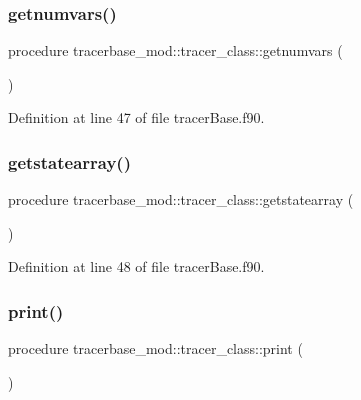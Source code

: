 \subsubsection{\texorpdfstring{getnumvars()}{getnumvars()}}
{\footnotesize\ttfamily procedure tracerbase\+\_\+mod\+::tracer\+\_\+class\+::getnumvars (\begin{DoxyParamCaption}{ }\end{DoxyParamCaption})\hspace{0.3cm}{\ttfamily [private]}}



Definition at line 47 of file tracer\+Base.\+f90.

\mbox{\label{structtracerbase__mod_1_1tracer__class_ada976e2f5180866e2d5999c087b38fdc}} 
\subsubsection{\texorpdfstring{getstatearray()}{getstatearray()}}
{\footnotesize\ttfamily procedure tracerbase\+\_\+mod\+::tracer\+\_\+class\+::getstatearray (\begin{DoxyParamCaption}{ }\end{DoxyParamCaption})\hspace{0.3cm}{\ttfamily [private]}}



Definition at line 48 of file tracer\+Base.\+f90.

\mbox{\label{structtracerbase__mod_1_1tracer__class_a1142993acbb67b4fe43c52b554165e71}} 
\subsubsection{\texorpdfstring{print()}{print()}}
{\footnotesize\ttfamily procedure tracerbase\+\_\+mod\+::tracer\+\_\+class\+::print (\begin{DoxyParamCaption}{ }\end{DoxyParamCaption})\hspace{0.3cm}{\ttfamily [private]}}



